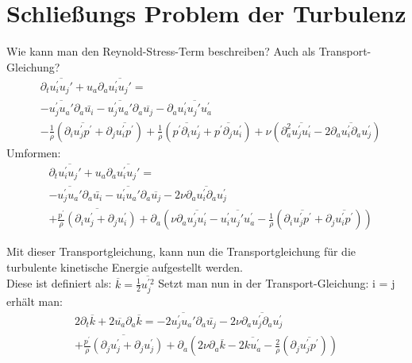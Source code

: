 \documentclass[11pt,t]{beamer}
\newcommand*\mean[1]{\overline{#1}}
\begin{document}
\section{Schließungs Problem der Turbulenz}
\begin{frame}
Wie kann man den Reynold-Stress-Term beschreiben? Auch als Transport-Gleichung?
\begin{align*}
&\partial_t\overline{u_i^{'}u_j{'}}+u_a\partial_a\overline{u_i^{'}u_j{'}} =\\& -\overline{u_j^{'}u_a{'}}\partial_a\bar{u_i}
-\overline{u_j^{'}u_a{'}}\partial_a\overline{u_j}-\partial_a\overline{u_i^{'}u_j{'}u_a^{'}} \\&- \frac{1}{\rho}(\partial_i\overline{u_j^{'}p^{'}}+\partial_j\overline{u_i^{'}p^{'}})+\frac{1}{\rho}(\overline{p^{'}\partial_iu_j^{'}}+\overline{p^{'}\partial_ju_i^{'}})+\nu(\partial_a^{2}\overline{u_j^{'}u_i^{'}}-2\overline{\partial_au_i^{'}\partial_au_j^{'}})
\end{align*}
Umformen:
\begin{align*}
&\partial_t\overline{u_i^{'}u_j{'}}+u_a\partial_a\overline{u_i^{'}u_j{'}} =\\& -\overline{u_j^{'}u_a{'}}\partial_a\bar{u_i}
-\overline{u_i^{'}u_a{'}}\partial_a\overline{u_j}- 2\nu\overline{\partial_au_i^{'}\partial_au_j^{'}}\\&+\overline{\frac{p^{'}}{\rho}(\partial_iu_j^{'}+\partial_ju_i^{'})}+\partial_a (\nu\partial_a\overline{u_j^{'}u_i^{'}} -\overline{u_i^{'}u_j{'}u_a^{'}}-\frac{1}{\rho}(\partial_i\overline{u_j^{'}p^{'}}+\partial_j\overline{u_i^{'}p^{'}}))
\end{align*}
\end{frame}
\begin{frame}
Mit dieser Transportgleichung, kann nun die Transportgleichung für die turbulente kinetische Energie aufgestellt werden.\\
Diese ist definiert als: $\mean{k} = \frac{1}{2}\mean{u_j^{'2}}$
Setzt man nun in der Transport-Gleichung: i = j erhält man:
\begin{align*}
2\partial_t \mean{k} + 2\mean{u_a}\partial_a \mean{k} = -2\overline{u_j^{'}u_a{'}}\partial_a\bar{u_j}
- 2\nu\overline{\partial_au_j^{'}\partial_au_j^{'}}\\+\overline{\frac{p^{'}}{\rho}(\partial_ju_j^{'}+\partial_ju_j^{'})}+\partial_a (2\nu\partial_a\overline{k} -2\overline{k u_a^{'}}-\frac{2}{\rho}(\partial_j\overline{u_j^{'}p^{'}}))
\end{align*}

\end{frame}
\end{document}
